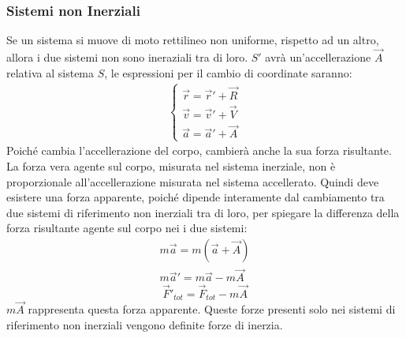 \documentclass{article}
\numberwithin{equation}{subsection}
\begin{document}
\begin{center}\end{center}

\subsubsection{Sistemi non Inerziali}
Se un sistema si muove di moto rettilineo non uniforme, 
rispetto ad un altro, allora i due sistemi non sono ineraziali tra di loro. 
$S'$ avrà un'accellerazione $\vec A$ relativa al sistema $S$, 
le espressioni per il cambio di coordinate saranno:
\begin{gather}
    \begin{cases}
        \vec{r}=\vec{r}'+\vec{R}\\
        \vec{v}=\vec{v}'+\vec{V}\\
        \vec{a}=\vec{a}'+\vec{A}
    \end{cases}
\end{gather}
Poiché cambia l'accellerazione del corpo, cambierà anche 
la sua forza risultante. La forza vera agente sul corpo, misurata nel sistema inerziale, non è proporzionale all'accellerazione misurata nel sistema accellerato. 
Quindi deve esistere una forza apparente, poiché dipende 
interamente dal cambiamento tra due sistemi di riferimento 
non inerziali tra di loro, per spiegare la differenza della 
forza risultante agente sul corpo nei i due sistemi:
\begin{gather*}
    m\vec{a}=m(\vec{a}+\vec{A})\\
    m\vec{a}'=m\vec{a}-m\vec{A}
\end{gather*}
\begin{equation}
    \vec{F}'_{tot}=\vec{F}_{tot}-m\vec{A}
\end{equation}
$m\vec{A}$ rappresenta questa forza apparente. Queste forze presenti solo nei sistemi di riferimento non inerziali vengono definite forze di inerzia. 
\end{document}
